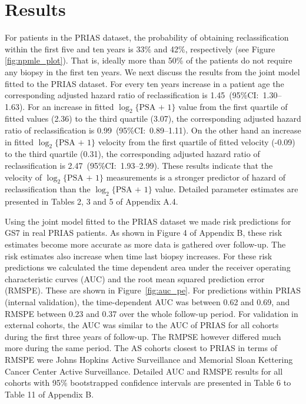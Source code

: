 \section{Results}
For patients in the PRIAS dataset, the probability of obtaining reclassification within the first five and ten years is 33\% and 42\%, respectively (see Figure \ref{fig:npmle_plot}). That is, ideally more than 50\% of the patients do not require any biopsy in the first ten years. We next discuss the results from the joint model fitted to the PRIAS dataset. For every ten years increase in a patient age the corresponding adjusted hazard ratio of reclassification is 1.45~(95\%CI:~1.30--1.63). For an increase in fitted $\log_2\{\mbox{PSA + 1}\}$ value from the first quartile of fitted values (2.36) to the third quartile (3.07), the corresponding adjusted hazard ratio of reclassification is 0.99~(95\%CI:~0.89--1.11). On the other hand an increase in fitted $\log_2\{\mbox{PSA + 1}\}$ velocity from the first quartile of fitted velocity (-0.09) to the third quartile (0.31), the corresponding adjusted hazard ratio of reclassification is 2.47~(95\%CI:~1.93--2.99). These results indicate that the velocity of $\log_2\{\mbox{PSA + 1}\}$ measurements is a stronger predictor of hazard of reclassification than the $\log_2\{\mbox{PSA + 1}\}$ value. Detailed parameter estimates are presented in Tables 2, 3 and 5 of Appendix A.4.

Using the joint model fitted to the PRIAS dataset we made risk predictions for GS7 in real PRIAS patients. As shown in Figure 4 of Appendix B, these risk estimates become more accurate as more data is gathered over follow-up. The risk estimates also increase when time last biopsy increases. For these risk predictions we calculated the time dependent area under the receiver operating characteristic curves (AUC) and the root mean squared prediction error (RMSPE). These are shown in Figure~\ref{fig:auc_pe}. For predictions within PRIAS (internal validation), the time-dependent AUC was between 0.62 and 0.69, and RMSPE between 0.23 and 0.37 over the whole follow-up period. For validation in external cohorts, the AUC was similar to the AUC of PRIAS for all cohorts during the first three years of follow-up. The RMPSE however differed much more during the same period. The AS cohorts closest to PRIAS in terms of RMSPE were Johns Hopkins Active Surveillance and Memorial Sloan Kettering Cancer Center Active Surveillance. Detailed AUC and RMSPE results for all cohorts with 95\% bootstrapped confidence intervals are presented in Table 6 to Table 11 of Appendix B.

